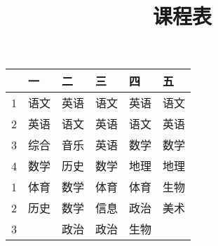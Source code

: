 \documentclass[11pt]{ctexart}
\title{课程表}
\begin{document}
\begin{center}
  \begin{tabular}{rlllll}
    \hline
    &  一    &  二    &  三    &  四    &  五    \\
    \hline
    1  &  语文  &  英语  &  语文  &  英语  &  语文  \\
    2  &  英语  &  语文  &  英语  &  语文  &  英语  \\
    3  &  综合  &  音乐  &  英语  &  数学  &  数学  \\
    4  &  数学  &  历史  &  数学  &  地理  &  地理  \\
    \hline
    1  &  体育  &  数学  &  体育  &  体育  &  生物  \\
    2  &  历史  &  数学  &  信息  &  政治  &  美术  \\
    3  &        &  政治  &  政治  &  生物  &        \\
    \hline
  \end{tabular}
\end{center}
\end{document}
